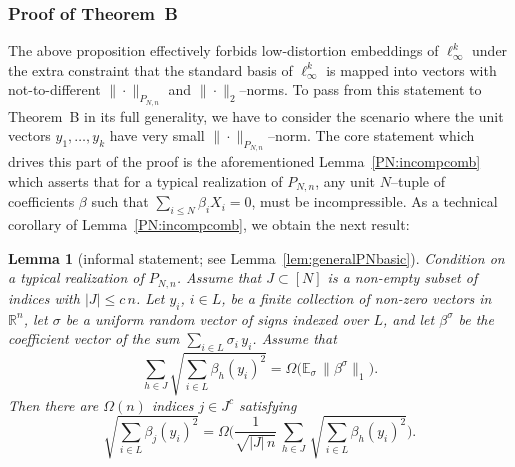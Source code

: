 \documentclass[11pt]{amsart}
\newtheorem*{lemma*}{Lemma}
\theoremstyle{definition}
\theoremstyle{plain}
\newcommand{\R}{\mathbb{R}}
\def\R{{\mathbb R}}
\def\Exp{{\mathbb E}}
\begin{document}
\subsubsection{Proof of Theorem~B}
The above proposition effectively forbids low-distortion embeddings
of $\ell_\infty^k$ under the extra constraint
that the standard basis of $\ell_\infty^k$ is mapped into
vectors with not-to-different $\|\cdot\|_{P_{N,n}}$ and $\|\cdot\|_2$--norms.
To pass from this statement to Theorem~B in its full generality,
we have to consider the scenario where the unit vectors $y_1,\dots,y_k$
have very small $\|\cdot\|_{P_{N,n}}$--norm.
The core statement which drives this part of the proof
is the aforementioned Lemma~\ref{PN:incompcomb}
which asserts that for a typical realization of $P_{N,n}$,
any unit $N$--tuple of coefficients $\beta$
such that $\sum_{i\leq N}\beta_i X_i=0$,
must be incompressible. As a technical corollary of Lemma~\ref{PN:incompcomb},
we obtain the next result:

\begin{lemma*}[informal statement; see Lemma~\ref{lem:generalPNbasic}]
Condition on a typical realization of $P_{N,n}$.
Assume that $J\subset [N]$
is a non-empty subset of indices with
$|J|\leq c\,n$.
Let $y_i$, $i\in L$, be a finite collection of non-zero vectors
in $\R^n$, let $\sigma$ be a uniform random
vector of signs indexed over $L$, and 
let $\beta^\sigma$ be the coefficient vector of the sum
$\sum_{i\in L}\sigma_i\,y_i$.
Assume that
\begin{equation}\label{eq: over 0498h34iq}
\sum_{h\in J}\sqrt{\sum_{i\in L}\beta_h(y_i)^2}
=\Omega\Big(
\Exp_{\sigma}\,\|\beta^\sigma\|_1\Big).
\end{equation}
Then there are $\Omega(n)$
indices $j\in J^c$ satisfying
$$
\sqrt{\sum_{i\in L}\beta_j(y_i)^2}
=\Omega\Big(
\frac{1}{\sqrt{|J|\,n}}\,
\sum_{h\in J}
\,\sqrt{\sum_{i\in L}\beta_h(y_i)^2}\Big).
$$
\end{lemma*}
\end{document}
